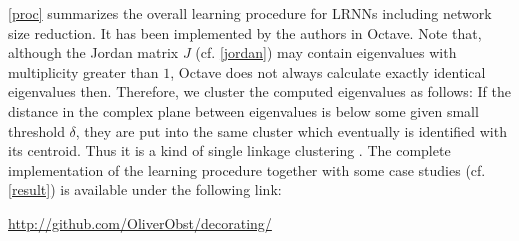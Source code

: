 \documentclass[preprint,12pt,times,authoryear]{elsarticle}%
\theoremstyle{definition}
\begin{document}
\cref{proc} summarizes the overall learning procedure for LRNNs including
network size reduction. It has been implemented by the authors in Octave. Note
that, although the Jordan matrix $J$ (cf. \cref{jordan}) may
contain eigenvalues with multiplicity greater than $1$, Octave does not always
calculate exactly identical eigenvalues then. Therefore, we cluster the
computed eigenvalues as follows: If the distance in the complex plane between
eigenvalues is below some given small threshold $\delta$, they are put into the
same cluster which eventually is identified with its centroid. Thus it is a kind
of single linkage clustering \citep{GR69}. The complete implementation of the
learning procedure together with some case studies (cf. \cref{result}) is
available under the following link:
\begin{center}
	\url{http://github.com/OliverObst/decorating/}
\end{center}
\end{document}
